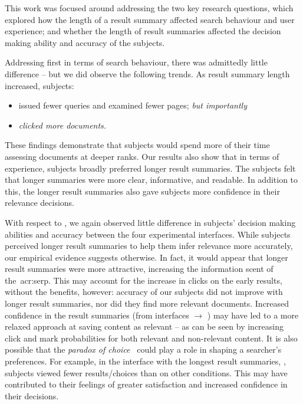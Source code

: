 This work was focused around addressing the two key research questions, which explored  how the length of a result summary affected search behaviour and user experience; and  whether the length of result summaries affected the decision making ability and accuracy of the subjects.

Addressing  first in terms of search behaviour, there was admittedly little difference -- but we did observe the following trends. As result summary length increased, subjects:

\begin{itemize}
    \item{issued fewer queries and examined fewer pages; \emph{but importantly}}
    \item{\emph{clicked more documents.}}
\end{itemize}

These findings demonstrate that subjects would spend more of their time assessing documents at deeper ranks. Our results also show that in terms of experience, subjects broadly preferred longer result summaries. The subjects felt that longer summaries were more clear, informative, and readable. In addition to this, the longer result summaries also gave subjects more confidence in their relevance decisions.

With respect to , we again observed little difference in subjects' decision making abilities and accuracy between the four experimental interfaces. While subjects perceived longer result summaries to help them infer relevance more accurately, our empirical evidence suggests otherwise. In fact, it would appear that longer result summaries were more attractive, increasing the information scent of the~\gls{acr:serp}. This may account for the increase in clicks on the early results, without the benefits, however: accuracy of our subjects did not improve with longer result summaries, nor did they find more relevant documents. Increased confidence in the result summaries (from interfaces  $\rightarrow$ ) may have led to a more relaxed approach at saving content as relevant -- as can be seen by increasing click and mark probabilities for both relevant and non-relevant content. It is also possible that the \emph{paradox of choice}~\citep{oulasvirta2009serp_size} could play a role in shaping a searcher's preferences. For example, in the interface with the longest result summaries, , subjects viewed fewer results/choices than on other conditions. This may have contributed to their feelings of greater satisfaction and increased confidence in their decisions.

